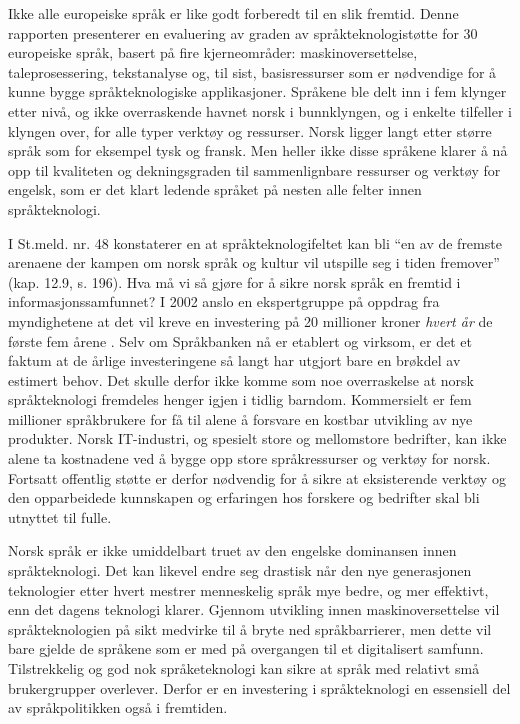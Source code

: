 \begin{multicols}{2}
Ikke alle europeiske språk er like godt forberedt til en slik fremtid. Denne rapporten presenterer en evaluering av graden av språkteknologistøtte for 30 europeiske språk, basert på fire kjerneområder: maskinoversettelse, taleprosessering, tekstanalyse og, til sist, basisressurser som er nødvendige for å kunne bygge språkteknologiske applikasjoner. Språkene ble delt inn i fem klynger etter nivå, og ikke overraskende havnet norsk i bunnklyngen, og i enkelte tilfeller i klyngen over, for alle typer verktøy og ressurser. Norsk ligger langt etter større språk som for eksempel tysk og fransk. Men heller ikke disse språkene klarer å nå opp til kvaliteten og dekningsgraden til sammenlignbare ressurser og verktøy for engelsk, som er det klart ledende språket på nesten alle felter innen språkteknologi.

I St.meld. nr. 48 \cite{stm48:2002} konstaterer en at språkteknologifeltet kan bli ``en av de fremste arenaene der kampen om norsk språk og kultur vil utspille seg i tiden fremover'' (kap. 12.9, s. 196). Hva må vi så gjøre for å sikre norsk språk en fremtid i informasjonssamfunnet? I 2002 anslo en ekspertgruppe på oppdrag fra myndighetene  at det vil kreve en investering på 20 millioner kroner \emph{hvert år} de første fem årene \cite{SR:2002:eng}. Selv om Språkbanken nå er etablert og virksom, er det et faktum at de årlige investeringene så langt har utgjort bare en brøkdel av estimert behov. Det skulle derfor ikke komme som noe overraskelse at norsk språkteknologi fremdeles henger igjen i tidlig barndom. Kommersielt er fem millioner språkbrukere for få til alene å forsvare en kostbar utvikling av nye produkter. Norsk IT-industri, og spesielt store og mellomstore bedrifter, kan ikke alene ta kostnadene ved å bygge opp store språkressurser og verktøy for norsk. Fortsatt offentlig støtte er derfor nødvendig for å sikre at eksisterende verktøy og den opparbeidede kunnskapen og erfaringen hos forskere og bedrifter skal bli utnyttet til fulle. 

Norsk språk er ikke umiddelbart truet av den engelske dominansen innen språkteknologi. Det kan likevel endre seg drastisk når den nye generasjonen teknologier etter hvert mestrer menneskelig språk mye bedre, og mer effektivt, enn det dagens teknologi klarer. Gjennom utvikling innen maskinoversettelse vil språkteknologien på sikt medvirke til å bryte ned språkbarrierer, men dette vil bare gjelde de språkene som er med på overgangen til et digitalisert samfunn. Tilstrekkelig og god nok språketeknologi kan sikre at språk med relativt små brukergrupper overlever. Derfor er en investering i språkteknologi en essensiell del av språkpolitikken også i fremtiden.                                


\end{multicols}
